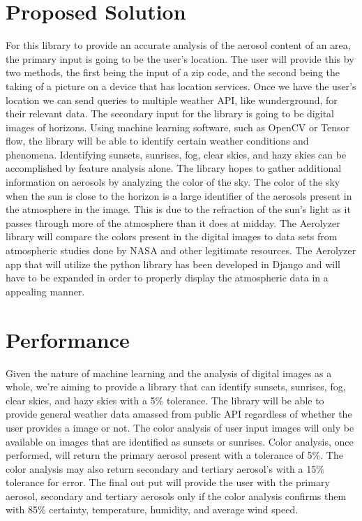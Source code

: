 \documentclass[letterpaper, 10pt, titlepage, fleqn, onecolumn]{article}
\begin{document}
\section*{Proposed Solution}
For this library to provide an accurate analysis of the aerosol content of an area, the primary input is going to be the user's location. The user will provide this by two methods, the first being the input of a zip code, and the second being the taking of a picture on a device that has location services. Once we have the user's location we can send queries to multiple weather API, like wunderground, for their relevant data. The secondary input for the library is going to be digital images of horizons. Using machine learning software, such as OpenCV or Tensor flow, the library will be able to identify certain weather conditions and phenomena. Identifying sunsets, sunrises, fog, clear skies, and hazy skies can be accomplished by feature analysis alone. The library hopes to gather additional information on aerosols by analyzing the color of the sky. The color of the sky when the sun is close to the horizon is a large identifier of the aerosols present in the atmosphere in the image. This is due to the refraction of the sun's light as it passes through more of the atmosphere than it does at midday. The Aerolyzer library will compare the colors present in the digital images to data sets from atmospheric studies done by NASA and other legitimate resources. The Aerolyzer app that will utilize the python library has been developed in Django and will have to be expanded in order to properly display the atmospheric data in a appealing manner.

\section*{Performance}
Given the nature of machine learning and the analysis of digital images as a whole, we're aiming to provide a library that can identify sunsets, sunrises, fog, clear skies, and hazy skies with a 5\% tolerance. The library will be able to provide general weather data amassed from public API regardless of whether the user provides a image or not. The color analysis of user input images will only be available on images that are identified as sunsets or sunrises. Color analysis, once performed, will return the primary aerosol present with a tolerance of 5\%. The color analysis may also return secondary and tertiary aerosol's with a 15\% tolerance for error. The final out put will provide the user with the primary aerosol, secondary and tertiary aerosols only if the color analysis confirms them with 85\% certainty, temperature, humidity, and average wind speed.


\pagebreak

\iffalse

\fi
\end{document}
